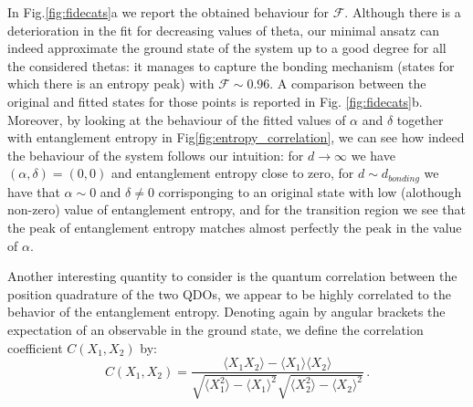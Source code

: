 \documentclass[reprint, amsmath, amssymb, floatfix, aps, pra]{revtex4-2}
\begin{document}
    In Fig.\ref{fig:fidecats}a we report the obtained behaviour for $\mathcal{F}$. Although there is a deterioration in the fit for decreasing values of theta, our minimal ansatz can indeed approximate the ground state of the system up to a good degree for all the considered thetas: it manages to capture the bonding mechanism (states for which there is an entropy peak) with $\mathcal{F}\sim 0.96$. A comparison between the original and fitted states for those points is reported in Fig. \ref{fig:fidecats}b. Moreover, by looking at the behaviour of the fitted values of $\alpha$ and $\delta$ together with entanglement entropy in Fig\ref{fig:entropy_correlation}, we can see how indeed the behaviour of the system follows our intuition: for $d\rightarrow\infty$ we have $(\alpha, \delta) = (0,0)$ and entanglement entropy close to zero, for $d\sim d_{bonding}$ we have that $\alpha \sim 0$ and $\delta\neq 0$ corrisponging to an original state with low (alothough non-zero) value of entanglement entropy, and for the transition region we see that the peak of entanglement entropy matches almost perfectly the peak in the value of $\alpha$.

    Another interesting quantity to consider is the quantum correlation between the position quadrature of the two QDOs, we appear to be highly correlated to the behavior of the entanglement entropy. Denoting again by angular brackets the expectation of an observable in the ground state, we define the correlation coefficient $C(X_1, X_2)$ by:
    \begin{equation*}
        C(X_1, X_2) = \frac{\langle X_1X_2\rangle - \langle X_1\rangle\langle X_2\rangle}{\sqrt{\langle X_1^2\rangle - \langle X_1\rangle^2}\sqrt{\langle X_2^2\rangle - \langle X_2\rangle^2}}\,.
    \end{equation*}
\end{document}
